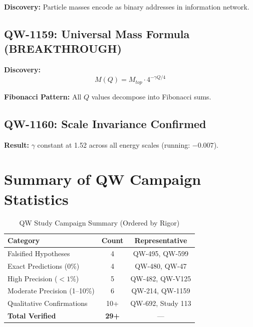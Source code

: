 \documentclass[11pt, a4paper]{article}
\theoremstyle{remark}
\begin{document}
\textbf{Discovery:} Particle masses encode as binary addresses in information network.

\subsection{QW-1159: Universal Mass Formula (BREAKTHROUGH)}

\textbf{Discovery:}
\begin{equation}
\boxed{M(Q) = M_{top} \cdot 4^{-\gamma Q/4}}
\end{equation}

\textbf{Fibonacci Pattern:} All $Q$ values decompose into Fibonacci sums.

\subsection{QW-1160: Scale Invariance Confirmed}

\textbf{Result:} $\gamma$ constant at 1.52 across all energy scales (running: $-0.007$).

\section{Summary of QW Campaign Statistics}

\begin{table}[H]
\centering
\caption{QW Study Campaign Summary (Ordered by Rigor)}
\begin{tabular}{|l|c|c|}
\hline
\textbf{Category} & \textbf{Count} & \textbf{Representative} \\
\hline
Falsified Hypotheses & 4 & QW-495, QW-599 \\
Exact Predictions (0\%) & 4 & QW-480, QW-47 \\
High Precision ($<1\%$) & 5 & QW-482, QW-V125 \\
Moderate Precision (1--10\%) & 6 & QW-214, QW-1159 \\
Qualitative Confirmations & 10+ & QW-692, Study 113 \\
\hline
\textbf{Total Verified} & \textbf{29+} & --- \\
\hline
\end{tabular}
\end{table}
\end{document}

